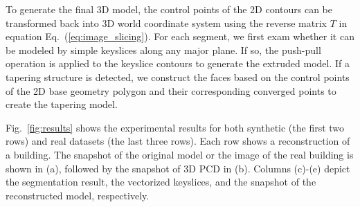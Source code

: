 \documentclass[10pt, conference, compsocconf]{IEEEtran}
\newcommand{\Eq}[1] {Eq.~(\ref{eq:#1})}
\newcommand{\Fig}[1]{Fig.~\ref{fig:#1}}
\begin{document}
To generate the final 3D model, the control
points of the 2D contours can be transformed back into 3D world coordinate system
using the reverse matrix $T$ in equation \Eq{image_slicing}.
For each segment, we first exam whether it can be modeled
by simple keyslices along any major plane.
If so, the push-pull operation is applied to the keyslice contours to
generate the extruded model.
If a tapering structure is detected, we construct the faces
based on the control points of the 2D base geometry polygon
and their corresponding converged points to create the tapering model.

\Fig{results} shows the experimental results for both synthetic (the first two rows)
and real datasets (the last three rows).
Each row shows a reconstruction of a building.
The snapshot of the original model or the image of the real building
is shown in (a), followed by the snapshot of 3D PCD in (b).
Columns (c)-(e) depict the segmentation result,
the vectorized keyslices, and the snapshot of the reconstructed model, respectively.
\end{document}
